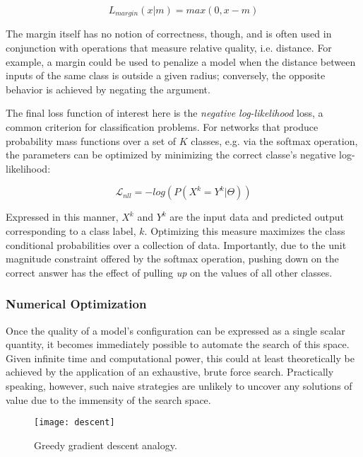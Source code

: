 \begin{equation}
\label{eq:mse}
L_{margin}(x | m) = max(0, x - m)
\end{equation}

\noindent The margin itself has no notion of correctness, though, and is often used in conjunction with operations that measure relative quality, i.e. distance.
For example, a margin could be used to penalize a model when the distance between inputs of the same class is outside a given radius;
conversely, the opposite behavior is achieved by negating the argument.

The final loss function of interest here is the \emph{negative log-likelihood} loss, a common criterion for classification problems.
For networks that produce probability mass functions over a set of $K$ classes, e.g. via the softmax operation, the parameters can be optimized by minimizing the correct classe's negative log-likelihood:

\begin{equation}
\label{eq:nll}
\mathcal{L}_{nll}=-log(P(X^k = Y^k \vert \Theta))
\end{equation}

\noindent Expressed in this manner, $X^k$ and $Y^k$ are the input data and predicted output corresponding to a class label, $k$.
Optimizing this measure maximizes the class conditional probabilities over a collection of data.
Importantly, due to the unit magnitude constraint offered by the softmax operation, pushing down on the correct answer has the effect of pulling \emph{up} on the values of all other classes.


\subsubsection{Numerical Optimization}
\label{subsubsec:numopt}
Once the quality of a model's configuration can be expressed as a single scalar quantity, it becomes immediately possible to automate the search of this space.
Given infinite time and computational power, this could at least theoretically be achieved by the application of an exhaustive, brute force search.
Practically speaking, however, such naive strategies are unlikely to uncover any solutions of value due to the immensity of the search space.

\begin{figure}
\begin{centering}
\texttt{[image: descent]}
\caption{Greedy gradient descent analogy.}
\label{fig:local_min}
\end{centering}
\end{figure}

